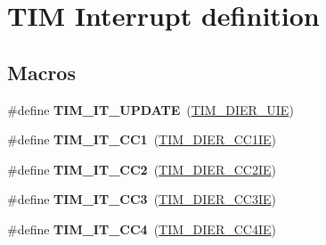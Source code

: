 \hypertarget{group___t_i_m___interrupt__definition}{}\section{T\+IM Interrupt definition}
\label{group___t_i_m___interrupt__definition}
\subsection*{Macros}
\begin{DoxyCompactItemize}
\item 
\#define {\bfseries T\+I\+M\+\_\+\+I\+T\+\_\+\+U\+P\+D\+A\+TE}~(\hyperlink{group___peripheral___registers___bits___definition_ga5c6d3e0495e6c06da4bdd0ad8995a32b}{T\+I\+M\+\_\+\+D\+I\+E\+R\+\_\+\+U\+IE})\hypertarget{group___t_i_m___interrupt__definition_ga6a48ecf88cae0402ff084202bfdd4f8e}{}\label{group___t_i_m___interrupt__definition_ga6a48ecf88cae0402ff084202bfdd4f8e}

\item 
\#define {\bfseries T\+I\+M\+\_\+\+I\+T\+\_\+\+C\+C1}~(\hyperlink{group___peripheral___registers___bits___definition_ga1ba7f7ca97eeaf6cc23cd6765c6bf678}{T\+I\+M\+\_\+\+D\+I\+E\+R\+\_\+\+C\+C1\+IE})\hypertarget{group___t_i_m___interrupt__definition_ga02267a938ab4722c5013fffa447cf5a6}{}\label{group___t_i_m___interrupt__definition_ga02267a938ab4722c5013fffa447cf5a6}

\item 
\#define {\bfseries T\+I\+M\+\_\+\+I\+T\+\_\+\+C\+C2}~(\hyperlink{group___peripheral___registers___bits___definition_ga757c59b690770adebf33e20d3d9dec15}{T\+I\+M\+\_\+\+D\+I\+E\+R\+\_\+\+C\+C2\+IE})\hypertarget{group___t_i_m___interrupt__definition_ga60f6b6c424b62ca58d3fafd8f5955e4f}{}\label{group___t_i_m___interrupt__definition_ga60f6b6c424b62ca58d3fafd8f5955e4f}

\item 
\#define {\bfseries T\+I\+M\+\_\+\+I\+T\+\_\+\+C\+C3}~(\hyperlink{group___peripheral___registers___bits___definition_ga4edf003f04bcf250bddf5ed284201c2e}{T\+I\+M\+\_\+\+D\+I\+E\+R\+\_\+\+C\+C3\+IE})\hypertarget{group___t_i_m___interrupt__definition_ga6aef020aebafd9e585283fbbaf8b841f}{}\label{group___t_i_m___interrupt__definition_ga6aef020aebafd9e585283fbbaf8b841f}

\item 
\#define {\bfseries T\+I\+M\+\_\+\+I\+T\+\_\+\+C\+C4}~(\hyperlink{group___peripheral___registers___bits___definition_ga6ad0f562a014572793b49fe87184338b}{T\+I\+M\+\_\+\+D\+I\+E\+R\+\_\+\+C\+C4\+IE})\hypertarget{group___t_i_m___interrupt__definition_ga1dce7f1bc32a258f2964cb7c05f413a6}{}\label{group___t_i_m___interrupt__definition_ga1dce7f1bc32a258f2964cb7c05f413a6}


\end{DoxyCompactItemize}

